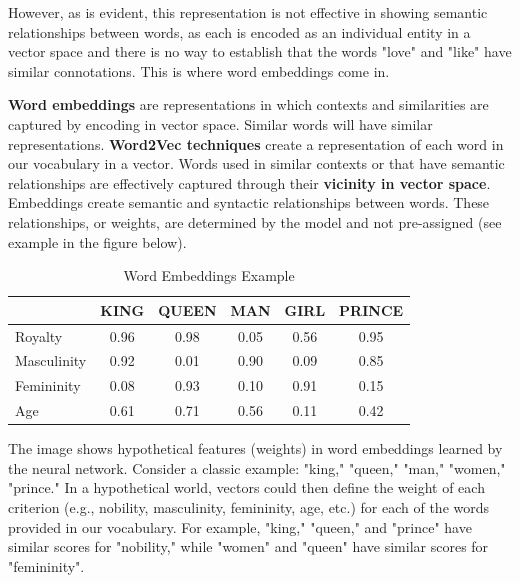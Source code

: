 However, as is evident, this representation is not effective in showing semantic relationships between words, as each is encoded as an individual entity in a vector space and there is no way to establish that the words "love" and "like" have similar connotations. This is where word embeddings come in.

\textbf{Word embeddings} are representations in which contexts and similarities are captured by encoding in vector space. Similar words will have similar representations. \textbf{Word2Vec techniques} create a representation of each word in our vocabulary in a vector. Words used in similar contexts or that have semantic relationships are effectively captured through their \textbf{vicinity in vector space}. Embeddings create semantic and syntactic relationships between words. These relationships, or weights, are determined by the model and not pre-assigned (see example in the figure below).
  
\begin{table}[h]
\centering
\begin{tabular}{|l|c|c|c|c|c|}
\hline
 & KING & QUEEN & MAN & GIRL & PRINCE \\
\hline
Royalty & \cellcolor{mygreen!25}0.96 & \cellcolor{mygreen!25}0.98 & \cellcolor{myblue!20}0.05 & \cellcolor{myblue!20}0.56 & \cellcolor{mygreen!25}0.95 \\
\hline
Masculinity & \cellcolor{myred!20}0.92 & \cellcolor{myorange!20}0.01 & \cellcolor{myred!20}0.90 & \cellcolor{myorange!20}0.09 & \cellcolor{myred!20}0.85 \\
\hline
Femininity & \cellcolor{myorange!20}0.08 & \cellcolor{myred!20}0.93 & \cellcolor{myorange!20}0.10 & \cellcolor{myred!20}0.91 & \cellcolor{myorange!20}0.15 \\
\hline
Age & \cellcolor{myblue!20}0.61 & \cellcolor{myblue!20}0.71 & \cellcolor{myblue!20}0.56 & \cellcolor{myblue!20}0.11 & \cellcolor{myorange!20}0.42 \\
\hline
\end{tabular} \caption{Word Embeddings Example}
\end{table}

The image shows hypothetical features (weights) in word embeddings learned by the neural network. Consider a classic example: "king," "queen," "man," "women," "prince." In a hypothetical world, vectors could then define the weight of each criterion (e.g., nobility, masculinity, femininity, age, etc.) for each of the words provided in our vocabulary. For example, "king," "queen," and "prince" have similar scores for "nobility," while "women" and "queen" have similar scores for "femininity".

